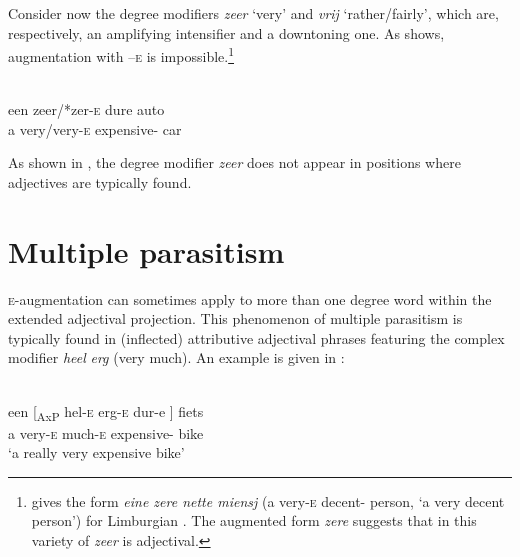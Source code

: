 \documentclass[output=paper]{langsci/langscibook}
\begin{document}
Consider now the degree modifiers \emph{zeer} \enquote*{very} and \emph{vrij}
‘rather/fairly’, which are, respectively, an amplifying
intensifier and a downtoning one. As  shows,
augmentation with –\textsc{e} is impossible.\footnote{\citet{Verdenius1939}
    gives the form \emph{eine zere nette miensj} (a very-\textsc{e}
    decent-\Agr{} person, \enquote*{a very decent person}) for Limburgian
    . The augmented form \emph{zere} suggests that in this variety
of  \emph{zeer} is adjectival.}

\ea%
    \label{ex:18.15}\\
    \gll een   zeer/*zer-\textsc{e}    dure                      auto\\
        a        very/very-\textsc{e}    expensive-\Agr{}    car\\
    \glt
\z

As shown in , the degree modifier \emph{zeer} does not appear in
positions where adjectives are typically found.

\ea%
    \label{ex:18.16}
	\z
\z

\section{Multiple parasitism}\label{sec:18.4}

\textsc{e-}augmentation can sometimes apply to more than one degree word within
the extended adjectival projection. This phenomenon of multiple parasitism is
typically found in (inflected) attributive adjectival phrases featuring the
complex modifier \emph{heel} \emph{erg} (very much). An example is given in
:\largerpage

\ea%
    \label{ex:18.17}\\
    \gll  een    [\textsubscript{AxP} hel-\textsc{e}    erg-\textsc{e}
    dur-e ]          fiets\\
    a   {}         very-\textsc{e}    much-\textsc{e}  expensive-\Agr{} {} bike\\
    \glt \enquote*{a really very expensive bike}
\z
\end{document}
